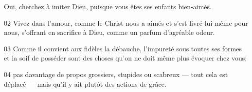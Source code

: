 Oui, cherchez à imiter Dieu, puisque vous êtes ses enfants bien-aimés.

02 Vivez dans l’amour, comme le Christ nous a aimés et s’est livré lui-même pour nous, s’offrant en sacrifice à Dieu, comme un parfum d’agréable odeur.

03 Comme il convient aux fidèles la débauche, l’impureté sous toutes ses formes et la soif de posséder sont des choses qu’on ne doit même plus évoquer chez vous;

04 pas davantage de propos grossiers, stupides ou scabreux --- tout cela est déplacé --- mais qu’il y ait plutôt des actions de grâce.
